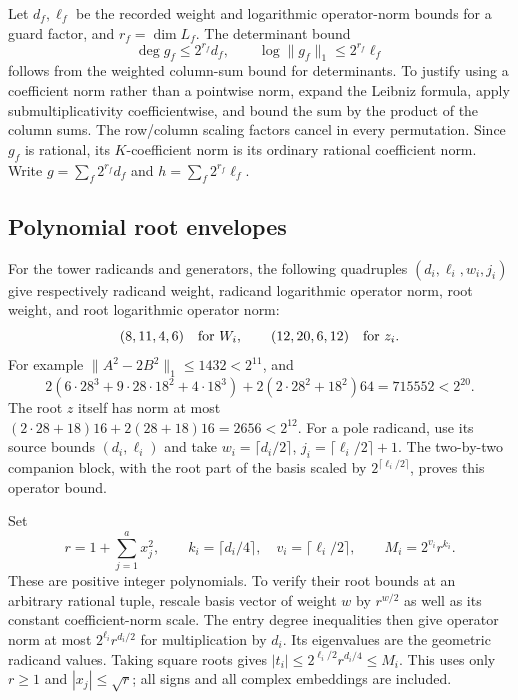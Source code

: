 \documentclass[11pt,a4paper]{article}
\theoremstyle{remark}\newtheorem{remark}[theorem]{Remark}
\begin{document}
Let $d_f,\ell_f$ be the recorded weight and logarithmic operator-norm
bounds for a guard factor, and $r_f=\dim L_f$. The determinant bound
\begin{equation}\label{eq:guardbounds}
 \deg g_f\le2^{r_f}d_f,\qquad
 \log\|g_f\|_1\le2^{r_f}\ell_f
\end{equation}
follows from the weighted column-sum bound for determinants. To justify
using a coefficient norm rather than a pointwise norm, expand the
Leibniz formula, apply submultiplicativity coefficientwise, and bound
the sum by the product of the column sums. The row/column scaling
factors cancel in every permutation. Since $g_f$ is rational, its
$K$-coefficient norm is its ordinary rational coefficient norm.
Write $g=\sum_f2^{r_f}d_f$ and $h=\sum_f2^{r_f}\ell_f$.

\subsection{Polynomial root envelopes}
For the tower radicands and generators, the following quadruples
$(d_i,\ell_i,w_i,j_i)$ give respectively radicand weight, radicand
logarithmic operator norm, root weight, and root logarithmic operator
norm:
\[
             (8,11,4,6)\quad\hbox{for }W_i,\qquad
             (12,20,6,12)\quad\hbox{for }z_i.
\]
For example $\|A^2-2B^2\|_1\le1432<2^{11}$, and
\[
 2(6\cdot28^3+9\cdot28\cdot18^2+4\cdot18^3)
       +2(2\cdot28^2+18^2)64=715552<2^{20}.
\]
The root $z$ itself has norm at most
$(2\cdot28+18)16+2(28+18)16=2656<2^{12}$.
For a pole radicand, use its source bounds $(d_i,\ell_i)$ and take
$w_i=\lceil d_i/2\rceil$, $j_i=\lceil\ell_i/2\rceil+1$.
The two-by-two companion block, with the root part of the basis scaled
by $2^{\lceil\ell_i/2\rceil}$, proves this operator bound.

Set
\[
 r=1+\sum_{j=1}^a x_j^2,\qquad
 k_i=\lceil d_i/4\rceil,\quad v_i=\lceil\ell_i/2\rceil,
 \qquad M_i=2^{v_i}r^{k_i}.
\]
These are positive integer polynomials. To verify their root bounds at
an arbitrary rational tuple, rescale basis vector of weight $w$ by
$r^{w/2}$ as well as its constant coefficient-norm scale.
The entry degree inequalities then give operator norm at most
$2^{\ell_i}r^{d_i/2}$ for multiplication by $d_i$.
Its eigenvalues are the geometric radicand values. Taking square
roots gives $|t_i|\le2^{\ell_i/2}r^{d_i/4}\le M_i$.
This uses only $r\ge1$ and $|x_j|\le\sqrt r$; all signs and all
complex embeddings are included.
\end{document}
